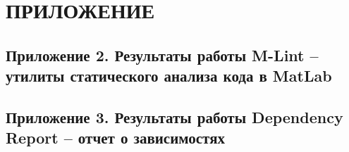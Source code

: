 \documentclass[utf8,usehyperref,12pt]{G7-32}
\begin{document}
\chapter{ПРИЛОЖЕНИЕ}
%

\section*{Приложение 2. Результаты работы M-Lint -- утилиты статического анализа кода в MatLab}

\section*{Приложение 3. Результаты работы Dependency Report -- отчет о зависимостях}
\end{document}
